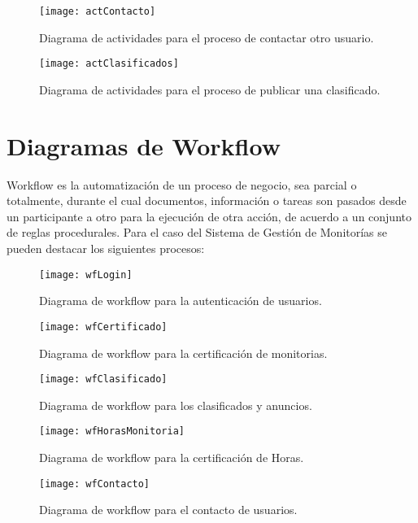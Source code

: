 \begin{figure}[H]
	\centering
	\texttt{[image: actContacto]}
	\centering
	\caption{Diagrama de actividades para el proceso de contactar otro usuario.}
	\label{fig:actContacto}
\end{figure}

\begin{figure}[H]
	\centering
	\texttt{[image: actClasificados]}
	\centering
	\caption{Diagrama de actividades para el proceso de publicar una clasificado.}
	\label{fig:actClasificados}
\end{figure}
\newpage
\newpage

\section{Diagramas de Workflow}

Workflow es la automatización de un proceso de negocio, sea parcial o totalmente, durante el cual documentos, información o tareas son pasados desde un participante a otro para la ejecución de otra acción, de acuerdo a un conjunto de reglas procedurales. \cite{workflow} Para el caso del Sistema de Gestión de Monitorías se pueden destacar los siguientes procesos:

\begin{figure}[H]
	\centering
	\texttt{[image: wfLogin]}
	\centering
	\caption{Diagrama de workflow para la autenticación de usuarios.}
	\label{fig:wfLogin}
\end{figure}
\begin{figure}[H]
	\centering
	\texttt{[image: wfCertificado]}
	\centering
	\caption{Diagrama de workflow para la certificación de monitorias.}
	\label{fig:wfCertificado}
\end{figure}
\clearpage
\begin{figure}[H]
	\centering
	\texttt{[image: wfClasificado]}
	\centering
	\caption{Diagrama de workflow para los clasificados y anuncios.}
	\label{fig:wfClasificado}
\end{figure}
\begin{figure}[H]
	\centering
	\texttt{[image: wfHorasMonitoria]}
	\centering
	\caption{Diagrama de workflow para la certificación de Horas.}
	\label{fig:wfHorasMonitoria}
\end{figure}
\clearpage
\begin{figure}[H]
	\centering
	\texttt{[image: wfContacto]}
	\centering
	\caption{Diagrama de workflow para el contacto de usuarios.}
	\label{fig:wfContacto}
\end{figure}

